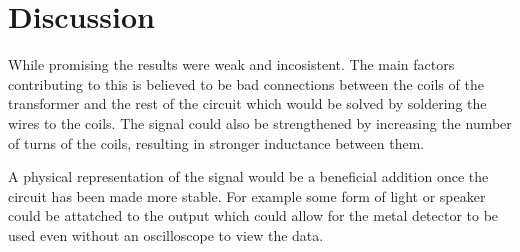 \section{Discussion}
% 
While promising the results were weak and incosistent. The main factors contributing to this is believed to be bad connections between the 
coils of the transformer and the rest of the circuit which would be solved by soldering the wires to the coils. The signal could also be 
strengthened by increasing the number of turns of the coils, resulting in stronger inductance between them. 

A physical representation of the signal would be a beneficial addition once the circuit has been made more stable. For example some form of 
light or speaker could be attatched to the output which could allow for the metal detector to be used even without an oscilloscope to 
view the data.